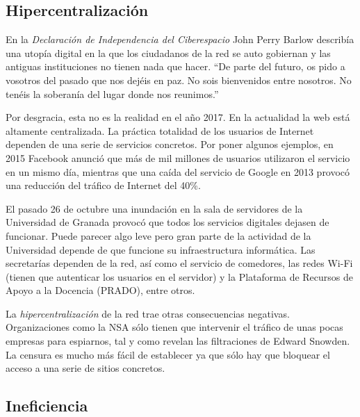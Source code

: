 \documentclass[12pt]{article} %
\begin{document}

\subsection{Hipercentralización} %
\label{sub:hipercentralización}

En la \textit{Declaración de Independencia del Ciberespacio}\cite{cyberspace-independence} John Perry Barlow describía una utopía digital en la que los ciudadanos de la red se auto gobiernan y las antiguas instituciones no tienen nada que hacer. ``De parte del futuro, os pido a vosotros del pasado que nos dejéis en paz. No sois bienvenidos entre nosotros. No tenéis la soberanía del lugar donde nos reunimos.'' 

Por desgracia, esta no es la realidad en el año 2017. En la actualidad la web está altamente centralizada. La práctica totalidad de los usuarios de Internet dependen de una serie de servicios concretos. Por poner algunos ejemplos, en 2015 Facebook anunció que más de mil millones de usuarios utilizaron el servicio en un mismo día\cite{billion-facebook}, mientras que una caída del servicio de Google en 2013 provocó una reducción del tráfico de Internet del 40\%\cite{google-outage}.

El pasado 26 de octubre una inundación en la sala de servidores de la Universidad de Granada provocó que todos los servicios digitales dejasen de funcionar. Puede parecer algo leve pero gran parte de la actividad de la Universidad depende de que funcione su infraestructura informática. Las secretarías dependen de la red, así como el servicio de comedores, las redes Wi-Fi (tienen que autenticar los usuarios en el servidor) y la Plataforma de Recursos de Apoyo a la Docencia (PRADO), entre otros.

La \textit{hipercentralización} de la red trae otras consecuencias negativas. Organizaciones como la NSA sólo tienen que intervenir el tráfico de unas pocas empresas para espiarnos, tal y como revelan las filtraciones de Edward Snowden\cite{snowden-leaks}. La censura es mucho más fácil de establecer ya que sólo hay que bloquear el acceso a una serie de sitios concretos. 


\subsection{Ineficiencia} %
\label{sub:ineficiencia}
\end{document}
